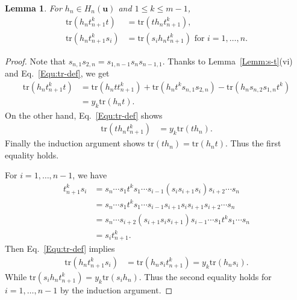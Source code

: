 \documentclass[a4paper, oneside]{amsart}
\numberwithin{equation}{section}
\newtheorem{lemma}[equation]{Lemma}
\theoremstyle{definition}
\theoremstyle{remark}
\begin{document}
\begin{lemma}\label{Lemm:Type-IV}For $h_{n}\in H_{n}(\boldsymbol{u})$ and $1\leq k\leq m-1$,
\begin{align*}
\mathrm{tr}(h_{n}t_{n+1}^kt)&=\mathrm{tr}(th_{n}t_{n+1}^k),\\
\mathrm{tr}(h_{n}t_{n+1}^ks_i)&=\mathrm{tr}(s_ih_{n}t_{n+1}^k) \text{ for }i=1, \ldots, n.
\end{align*}
\end{lemma}
\begin{proof}Note that $s_{n,1}s_{2,n}=s_{1,n-1}s_ns_{n-1,1}$. Thanks to Lemma~\ref{Lemm:s-t}(vi) and Eq.~\eqref{Equ:tr-def}, we get
\begin{align*}
\mathrm{tr}(h_{n}t_{n+1}^kt)&=\mathrm{tr}(h_{n}tt_{n+1}^k)+\mathrm{tr}(h_{n}t^ks_{n,1}s_{2,n})
-\mathrm{tr}(h_{n}s_{n,2}s_{1,n}t^k)\\
&=y_k\mathrm{tr}(h_{n}t).
\end{align*}
On the other hand, Eq.~\eqref{Equ:tr-def} shows
\begin{align*}
\mathrm{tr}(th_{n}t_{n+1}^k)&=y_k\mathrm{tr}(th_{n}).
\end{align*}
Finally the induction argument shows $\mathrm{tr}(th_{n})=\mathrm{tr}(h_{n}t)$. Thus  the first equality holds.

For $i=1, \ldots, n-1$, we have
\begin{align*}
 t_{n+1}^ks_i&=s_n\cdots s_1t^ks_1\cdots s_{i-1}(s_is_{i+1}s_i)s_{i+2}\cdots s_n \\
 &=s_n\cdots s_1t^ks_1\cdots s_{i-1}s_{i+1}s_is_{i+1}s_{i+2}\cdots s_n\\
 &=s_n\cdots s_{i+2} (s_{i+1}s_is_{i+1})s_{i-1}\cdots s_1t^ks_1\cdots  s_n\\
 &=s_it_{n+1}^k.
\end{align*}
 Then Eq.~\eqref{Equ:tr-def} implies \begin{align*}
\mathrm{tr}(h_{n}t_{n+1}^ks_i)&=\mathrm{tr}(h_{n}s_it_{n+1}^k)=y_k\mathrm{tr}(h_{n}s_i).
\end{align*}
While $\mathrm{tr}(s_ih_{n}t_{n+1}^k)=y_k\mathrm{tr}(s_ih_{n})$. Thus the second equality holds for $i=1, \ldots,n-1$ by the induction argument.


\end{proof}
\end{document}
